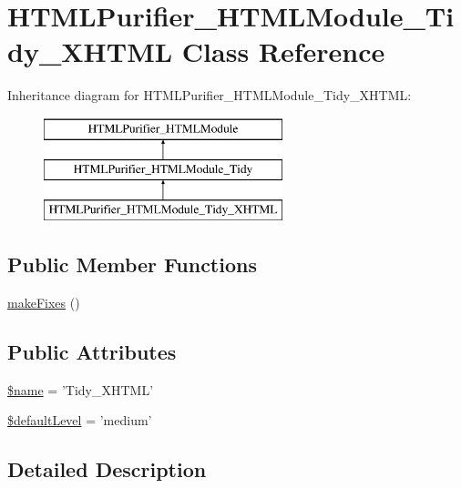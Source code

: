 \hypertarget{classHTMLPurifier__HTMLModule__Tidy__XHTML}{\section{H\+T\+M\+L\+Purifier\+\_\+\+H\+T\+M\+L\+Module\+\_\+\+Tidy\+\_\+\+X\+H\+T\+M\+L Class Reference}
\label{classHTMLPurifier__HTMLModule__Tidy__XHTML}
}
Inheritance diagram for H\+T\+M\+L\+Purifier\+\_\+\+H\+T\+M\+L\+Module\+\_\+\+Tidy\+\_\+\+X\+H\+T\+M\+L\+:\begin{figure}[H]
\begin{center}
\leavevmode
\includegraphics[height=3.000000cm]{classHTMLPurifier__HTMLModule__Tidy__XHTML}
\end{center}
\end{figure}
\subsection*{Public Member Functions}
\begin{DoxyCompactItemize}
\item 
\hyperlink{classHTMLPurifier__HTMLModule__Tidy__XHTML_a730388a8addeb28a3f3f93c5bd12c0b3}{make\+Fixes} ()
\end{DoxyCompactItemize}
\subsection*{Public Attributes}
\begin{DoxyCompactItemize}
\item 
\hyperlink{classHTMLPurifier__HTMLModule__Tidy__XHTML_a42cf1efb51b320104529733b00e82c53}{\$name} = 'Tidy\+\_\+\+X\+H\+T\+M\+L'
\item 
\hyperlink{classHTMLPurifier__HTMLModule__Tidy__XHTML_a811d4772eedfbb4c65db1a7003bf648c}{\$default\+Level} = 'medium'
\end{DoxyCompactItemize}


\subsection{Detailed Description}


